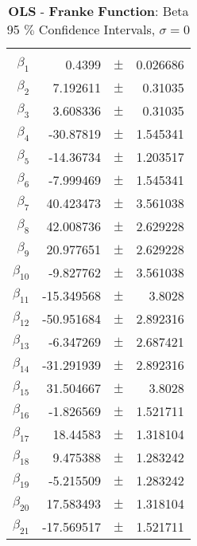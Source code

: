 \documentclass[...,numrefs]{wiley-article}
\begin{document}
\begin{table}[h]
    \centering
    \caption{$\textbf{OLS - Franke Function:}$ Beta 95 $\%$ Confidence Intervals, $\sigma = 0$}
    \begin{tabular}{rrrr}
    \hline
    \\
    $\beta_{1}$ & 0.4399 & $\pm$ & 0.026686 \\
    $\beta_{2}$ & 7.192611 & $\pm$ & 0.31035 \\
    $\beta_{3}$ & 3.608336 & $\pm$ & 0.31035 \\
    $\beta_{4}$ & -30.87819 & $\pm$ & 1.545341 \\
    $\beta_{5}$ & -14.36734 & $\pm$ & 1.203517 \\
    $\beta_{6}$ & -7.999469 & $\pm$ & 1.545341 \\
    $\beta_{7}$ & 40.423473 & $\pm$ & 3.561038 \\
    $\beta_{8}$ & 42.008736 & $\pm$ & 2.629228 \\
    $\beta_{9}$ & 20.977651 & $\pm$ & 2.629228 \\
    $\beta_{10}$ & -9.827762 & $\pm$ & 3.561038 \\
    $\beta_{11}$ & -15.349568 & $\pm$ & 3.8028 \\
    $\beta_{12}$ & -50.951684 & $\pm$ & 2.892316 \\
    $\beta_{13}$ & -6.347269 & $\pm$ & 2.687421 \\
    $\beta_{14}$ & -31.291939 & $\pm$ & 2.892316 \\
    $\beta_{15}$ & 31.504667 & $\pm$ & 3.8028 \\
    $\beta_{16}$ & -1.826569 & $\pm$ & 1.521711 \\
    $\beta_{17}$ & 18.44583 & $\pm$ & 1.318104 \\
    $\beta_{18}$ & 9.475388 & $\pm$ & 1.283242 \\
    $\beta_{19}$ & -5.215509 & $\pm$ & 1.283242 \\
    $\beta_{20}$ & 17.583493 & $\pm$ & 1.318104 \\
    $\beta_{21}$ & -17.569517 & $\pm$ & 1.521711 \\
    \hline
    \end{tabular}

    \label{first}
\end{table}
\end{document}
